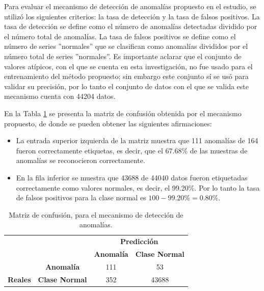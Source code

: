 Para evaluar el mecanismo de detecci\'{o}n de anomal\'{i}as propuesto en el estudio, se utiliz\'{o} los siguientes criterios: la tasa de detecci\'{o}n y la tasa de falsos positivos. La tasa de detección se define como el número de anomal\'{i}as detectadas dividido por el número total de anomal\'{i}as. La tasa de falsos positivos se define como el número de series ''normales'' que se clasifican como anomal\'{i}as divididos por el número total de series ''normales''. Es importante aclarar que el conjunto de valores at\'{i}picos, con el que se cuenta en esta investigaci\'{o}n, no fue usado para el entrenamiento del m\'{e}todo propuesto; sin embargo este conjunto s\'{i} se us\'{o} para validar su precisi\'{o}n, por lo tanto el conjunto de datos con el que se valida este mecanismo cuenta con 44204 datos.
 
\vspace{5mm} %

En la Tabla \ref{table:matriz_resultado} se presenta la matriz de confusi\'{o}n obtenida por el mecanismo propuesto, de donde se pueden obtener las siguientes afirmaciones:

\begin{itemize}
\item La entrada superior izquierda de la matriz muestra que 111 anomal\'{i}as de 164 fueron correctamente etiquetas, es decir, que el 67.68\% de las muestras de anomal\'{i}as se reconocieron correctamente.
\item En la fila inferior se muestra que 43688 de 44040 datos fueron etiquetadas correctamente como valores normales, es decir, el 99.20\%. Por lo tanto la tasa de falsos positivos para la clase normal es $100-99.20\% = 0.80\%$.
\end{itemize}

\begin{table}[H]

\centering
\begin{center}
\begin{tabular}{ll|c|c|}
\cline{3-4}
                                                        &                                              & \multicolumn{2}{c|}{\textbf{Predicci\'{o}n}}                                                          \\ \cline{3-4} 
                                                        &                                              & \textbf{Anomal\'{i}a}                         & \textbf{Clase Normal}                         \\ \hline
\multicolumn{1}{|c|}{}                                  & \multicolumn{1}{c|}{\textbf{Anomal\'{i}a}} & \cellcolor[HTML]{AADD99}111 & \cellcolor[HTML]{FFCE93}53 \\ \cline{2-4} 
\multicolumn{1}{|c|}{\multirow{-2}{*}{\textbf{Reales}}} & \multicolumn{1}{c|}{\textbf{Clase Normal}} & \cellcolor[HTML]{DF9F9F}352 & \cellcolor[HTML]{AADD99}43688 \\ \hline
\end{tabular}
\caption{Matriz de confusi\'{o}n, para el mecanismo de detecci\'{o}n de anomal\'{i}as.}
\label{table:matriz_resultado}
\end{center}
\end{table}

